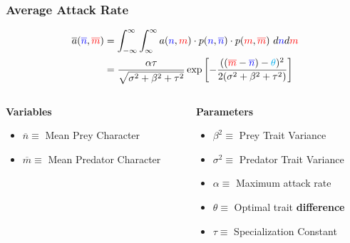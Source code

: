 \documentclass[10pt]{beamer}
\begin{document}
\begin{frame}
	\frametitle{Average Attack Rate}
	\begin{align*}
		\overline{a}({\color{blue}\overline{n}}, {\color{red}\overline{m}}) &= \int_{-\infty}^{\infty}\int_{\-\infty}^{\infty} a({\color{blue}n}, {\color{red}m}) \cdot p({\color{blue}n}, {\color{blue}\overline{n}}) \cdot p({\color{red}m}, {\color{red}\overline{m}})\ d{\color{blue}n} d{\color{red}m} \\
		&= \frac{\alpha\tau}{\sqrt{\sigma^2 + \beta^2 + \tau^2}}\exp\left[{-\frac{(({\color{red}\overline{m}} - {\color{blue}\overline{n}}) - {\color{cyan}\theta})^2}{2(\sigma^2 + \beta^2 + \tau^2)}}\right]
	\end{align*}\vskip0.35cm
	\begin{columns}
		\begin{column}{0.45\textwidth}
	{\bf Variables}
			\begin{itemize}
				\item {\color{blue}$\overline{n} \equiv $ Mean Prey Character}
				\item {\color{red}$\overline{m} \equiv $ Mean Predator Character}
			\end{itemize}
		\end{column}
		\begin{column}{0.5\textwidth}
	{\bf Parameters}
			\begin{itemize}
				\item $\beta^2 \equiv $ Prey Trait Variance
				\item $\sigma^2 \equiv $ Predator Trait Variance
				\item $\alpha \equiv $ Maximum attack rate
				\item {\color{cyan}$\theta \equiv $ Optimal trait \bf difference}
				\item $\tau \equiv $ Specialization Constant
			\end{itemize}
		\end{column}
	\end{columns}
\end{frame}
\end{document}
